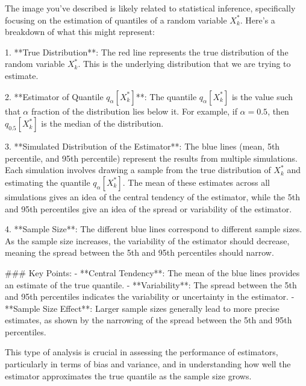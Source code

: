 The image you've described is likely related to statistical inference, specifically focusing on the estimation of quantiles of a random variable \( X^*_k \). Here's a breakdown of what this might represent:

1. **True Distribution**: The red line represents the true distribution of the random variable \( X^*_k \). This is the underlying distribution that we are trying to estimate.

2. **Estimator of Quantile \( q_\alpha[X^*_k] \)**: The quantile \( q_\alpha[X^*_k] \) is the value such that \( \alpha \) fraction of the distribution lies below it. For example, if \( \alpha = 0.5 \), then \( q_{0.5}[X^*_k] \) is the median of the distribution.

3. **Simulated Distribution of the Estimator**: The blue lines (mean, 5th percentile, and 95th percentile) represent the results from multiple simulations. Each simulation involves drawing a sample from the true distribution of \( X^*_k \) and estimating the quantile \( q_\alpha[X^*_k] \). The mean of these estimates across all simulations gives an idea of the central tendency of the estimator, while the 5th and 95th percentiles give an idea of the spread or variability of the estimator.

4. **Sample Size**: The different blue lines correspond to different sample sizes. As the sample size increases, the variability of the estimator should decrease, meaning the spread between the 5th and 95th percentiles should narrow.

### Key Points:
- **Central Tendency**: The mean of the blue lines provides an estimate of the true quantile.
- **Variability**: The spread between the 5th and 95th percentiles indicates the variability or uncertainty in the estimator.
- **Sample Size Effect**: Larger sample sizes generally lead to more precise estimates, as shown by the narrowing of the spread between the 5th and 95th percentiles.

This type of analysis is crucial in assessing the performance of estimators, particularly in terms of bias and variance, and in understanding how well the estimator approximates the true quantile as the sample size grows.